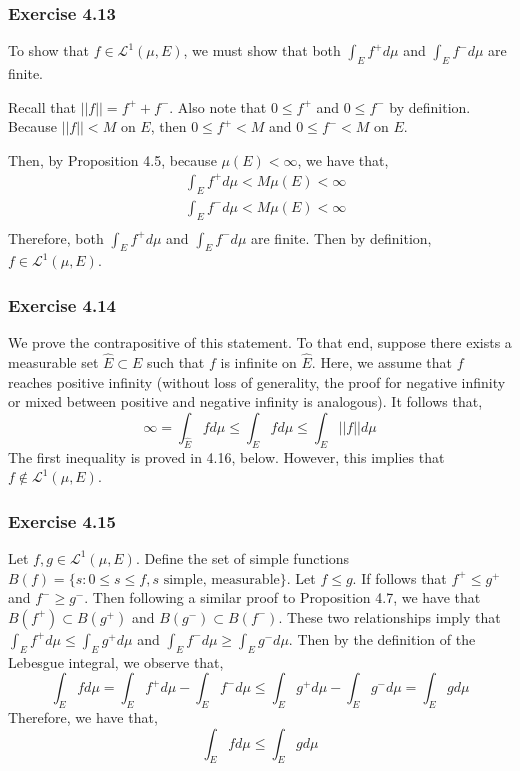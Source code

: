 \documentclass[letterpaper,12pt]{article}
\theoremstyle{definition}
\begin{document}
\subsubsection*{Exercise 4.13}
To show that $f \in \mathscr{L}^1(\mu, E)$, we must show that both $\int_E f^+ d\mu$ and $\int_E f^- d\mu$ are finite.

Recall that $||f|| = f^+ + f^-$. Also note that $0 \leq f^+$ and $0 \leq f^-$ by definition. Because $||f|| < M$ on $E$, then $0 \leq f^+ < M$ and $0 \leq f^- < M$ on $E$.

Then, by Proposition 4.5, because $\mu(E) < \infty$, we have that,
\begin{align*}
  &\int_E f^+ d\mu < M \mu(E) < \infty \\
  &\int_E f^- d\mu < M \mu(E) < \infty \\
\end{align*}
Therefore, both $\int_E f^+ d\mu$ and $\int_E f^- d\mu$ are finite. Then by definition, $f \in \mathscr{L}^1(\mu, E)$.

\subsubsection*{Exercise 4.14}
We prove the contrapositive of this statement. To that end, suppose there exists a measurable set $\hat{E} \subset E$ such that $f$ is infinite on $\hat{E}$. Here, we assume that $f$ reaches positive infinity (without loss of generality, the proof for negative infinity or mixed between positive and negative infinity is analogous). It follows that,
\begin{equation}
	\infty = \int_{\hat{E}} f d\mu \leq \int_E f d\mu \leq \int_E ||f|| d\mu
\end{equation}
The first inequality is proved in 4.16, below. However, this implies that $f \not\in \mathscr{L}^1(\mu,E)$.

\subsubsection*{Exercise 4.15}
Let $f,g \in \mathscr{L}^1(\mu,E)$. Define the set of simple functions $B(f) = \{ s : 0 \leq s \leq f, s \text{ simple, measurable}  \}$. Let $f \leq g$. If follows that $f^+ \leq g^+$ and $f^- \geq g^-$. Then following a similar proof to Proposition 4.7, we have that $B(f^+) \subset B(g^+)$ and $B(g^-) \subset B(f^-)$. These two relationships imply that $ \int_E f^+ d\mu \leq \int_E g^+ d\mu$ and $\int_E f^- d\mu \geq \int_E g^- d\mu$. Then by the definition of the Lebesgue integral, we observe that,
\begin{equation}
	\int_E fd\mu = \int_E f^+ d\mu - \int_E f^- d\mu \leq \int_E g^+ d\mu - \int_E g^- d\mu = \int_E g d\mu
\end{equation}
Therefore, we have that,
\begin{equation}
	\int_E fd\mu \leq \int_E g d\mu
\end{equation}
\end{document}
